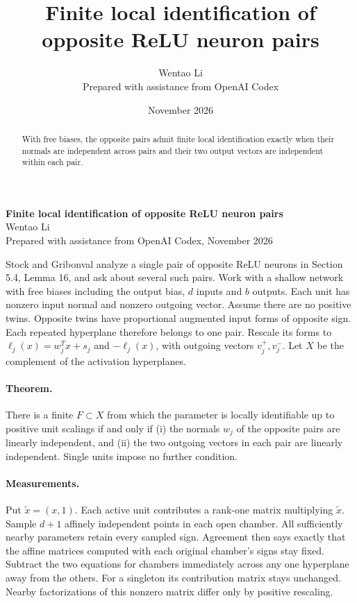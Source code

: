 \documentclass[10pt]{article}
\title{Finite local identification of opposite ReLU neuron pairs}
\author{Wentao Li\\{\small Prepared with assistance from OpenAI Codex}}
\date{November 2026}
\begin{document}
\begin{center}{\Large\bfseries Finite local identification of opposite ReLU neuron pairs}\\[3pt]Wentao Li\\{\small Prepared with assistance from OpenAI Codex, November 2026}\end{center}
\begin{abstract}
With free biases, the opposite pairs admit finite local identification exactly when their normals are independent across pairs and their two output vectors are independent within each pair.
\end{abstract}
Stock and Gribonval analyze a single pair of opposite ReLU neurons in Section 5.4, Lemma 16, and ask about several such pairs. Work with a shallow network with free biases including the output bias, $d$ inputs and $b$ outputs. Each unit has nonzero input normal and nonzero outgoing vector. Assume there are no positive twins. Opposite twins have proportional augmented input forms of opposite sign. Each repeated hyperplane therefore belongs to one pair. Rescale its forms to $\ell_j(x)=w_j^Tx+s_j$ and $-\ell_j(x)$, with outgoing vectors $v_j^+,v_j^-$. Let $X$ be the complement of the activation hyperplanes.

\paragraph{Theorem.} There is a finite $F\subset X$ from which the parameter is locally identifiable up to positive unit scalings if and only if (i) the normals $w_j$ of the opposite pairs are linearly independent, and (ii) the two outgoing vectors in each pair are linearly independent. Single units impose no further condition.

\paragraph{Measurements.} Put $\tilde x=(x,1)$. Each active unit contributes a rank-one matrix multiplying $\tilde x$. Sample $d+1$ affinely independent points in each open chamber. All sufficiently nearby parameters retain every sampled sign. Agreement then says exactly that the affine matrices computed with each original chamber's signs stay fixed. Subtract the two equations for chambers immediately across any one hyperplane away from the others. For a singleton its contribution matrix stays unchanged. Nearby factorizations of this nonzero matrix differ only by positive rescaling.
\end{document}

